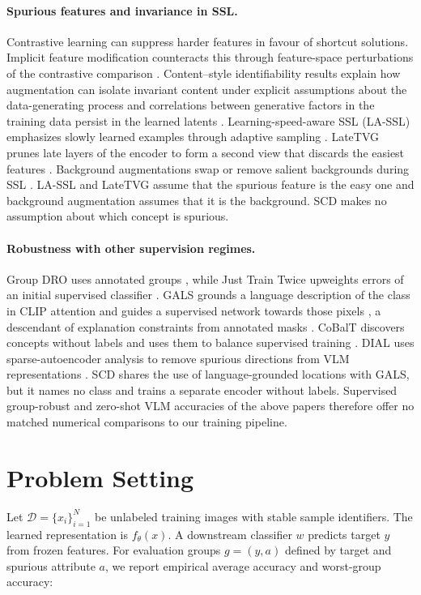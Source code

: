 \documentclass{article}
\begin{document}
\paragraph{Spurious features and invariance in SSL.}
Contrastive learning can suppress harder features in favour of shortcut solutions. Implicit feature modification counteracts this through feature-space perturbations of the contrastive comparison \citep{robinson2021shortcut}. Content--style identifiability results explain how augmentation can isolate invariant content under explicit assumptions about the data-generating process \citep{vonkugelgen2021content} and correlations between generative factors in the training data persist in the learned latents \citep{trauble2021correlated}. Learning-speed-aware SSL (LA-SSL) emphasizes slowly learned examples through adaptive sampling \citep{zhu2023lassl}. LateTVG prunes late layers of the encoder to form a second view that discards the easiest features \citep{hamidieh2024latetvg}. Background augmentations swap or remove salient backgrounds during SSL \citep{ryali2021background}. LA-SSL and LateTVG assume that the spurious feature is the easy one and background augmentation assumes that it is the background. SCD makes no assumption about which concept is spurious.

\paragraph{Robustness with other supervision regimes.}
Group DRO uses annotated groups \citep{sagawa2020groupdro}, while Just Train Twice upweights errors of an initial supervised classifier \citep{liu2021jtt}. GALS grounds a language description of the class in CLIP attention and guides a supervised network towards those pixels \citep{petryk2022gals}, a descendant of explanation constraints from annotated masks \citep{ross2017rrr}. CoBalT discovers concepts without labels and uses them to balance supervised training \citep{arefin2024cobalt}. DIAL uses sparse-autoencoder analysis to remove spurious directions from VLM representations \citep{yalavarthi2026dial}. SCD shares the use of language-grounded locations with GALS, but it names no class and trains a separate encoder without labels. Supervised group-robust and zero-shot VLM accuracies of the above papers therefore offer no matched numerical comparisons to our training pipeline.

\section{Problem Setting}
Let $\mathcal{D}=\{x_i\}_{i=1}^{N}$ be unlabeled training images with stable sample identifiers. The learned representation is $f_\theta(x)$. A downstream classifier $w$ predicts target $y$ from frozen features. For evaluation groups $g=(y,a)$ defined by target and spurious attribute $a$, we report empirical average accuracy and worst-group accuracy:
\end{document}

